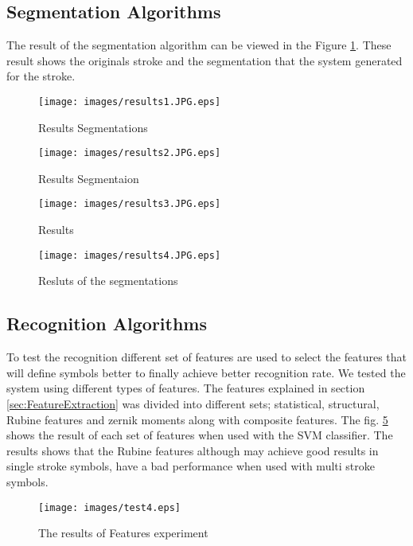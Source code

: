 

\subsection{Segmentation Algorithms}
\label{sec:SegmentationAlgorithms}
The result of the segmentation algorithm can be viewed in the Figure \ref{fig:results1.JPG}. These result shows the originals stroke and the segmentation that the system generated for the stroke. 
\begin{figure}
	\centering
		\texttt{[image: images/results1.JPG.eps]}
	\caption{Results Segmentations}
	\label{fig:results1.JPG}
\end{figure}
\begin{figure}
	\centering
		\texttt{[image: images/results2.JPG.eps]}
	\caption{Results Segmentaion }
	\label{fig:results2.JPG}
\end{figure}
\begin{figure}
	\centering
		\texttt{[image: images/results3.JPG.eps]}
	\caption{Results }
	\label{fig:results3.JPG}
\end{figure}
\begin{figure}
	\centering
		\texttt{[image: images/results4.JPG.eps]}
	\caption{Resluts of the segmentations}
	\label{fig:results4.JPG}
\end{figure}



\subsection {Recognition Algorithms}
\label{sec:RecognitionAlgorithms}%
To test the recognition different set of features are used to select the features that will define symbols better to finally achieve better recognition rate. We tested the system using different types of features. The features explained in section \ref{sec:FeatureExtraction} was divided into different sets; statistical, structural, Rubine features and zernik moments along with composite features. The fig. \ref{fig:testFeatures} shows the result of each set of features when used with the SVM classifier. The results shows that the Rubine features although may achieve good results in single stroke symbols, have a bad performance when used with multi stroke symbols. 
\begin{figure}[]
	\centering
		\texttt{[image: images/test4.eps]}
	\caption{The results of Features experiment}
	\label{fig:testFeatures}
\end{figure}



